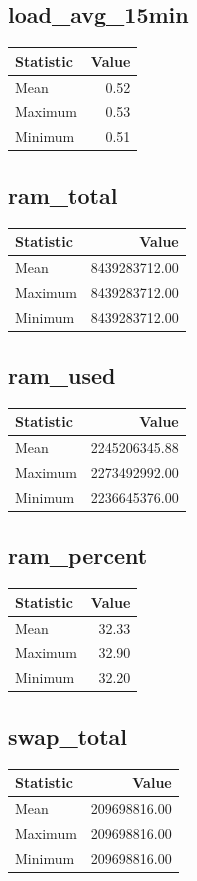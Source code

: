\documentclass[11pt]{article}
\begin{document}
\subsection{load_avg_15min}
\begin{tabular}{lr}
\toprule
Statistic & Value \\
\midrule
Mean & 0.52 \\
Maximum & 0.53 \\
Minimum & 0.51 \\
\bottomrule
\end{tabular}


\subsection{ram_total}
\begin{tabular}{lr}
\toprule
Statistic & Value \\
\midrule
Mean & 8439283712.00 \\
Maximum & 8439283712.00 \\
Minimum & 8439283712.00 \\
\bottomrule
\end{tabular}


\subsection{ram_used}
\begin{tabular}{lr}
\toprule
Statistic & Value \\
\midrule
Mean & 2245206345.88 \\
Maximum & 2273492992.00 \\
Minimum & 2236645376.00 \\
\bottomrule
\end{tabular}


\subsection{ram_percent}
\begin{tabular}{lr}
\toprule
Statistic & Value \\
\midrule
Mean & 32.33 \\
Maximum & 32.90 \\
Minimum & 32.20 \\
\bottomrule
\end{tabular}


\subsection{swap_total}
\begin{tabular}{lr}
\toprule
Statistic & Value \\
\midrule
Mean & 209698816.00 \\
Maximum & 209698816.00 \\
Minimum & 209698816.00 \\
\bottomrule
\end{tabular}
\end{document}

